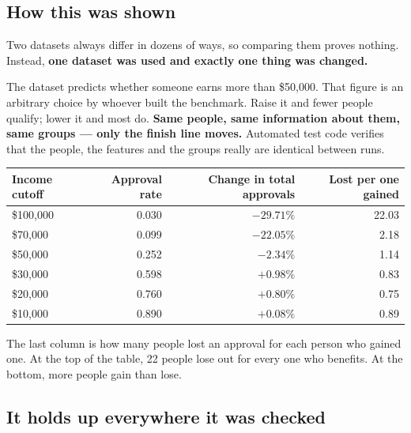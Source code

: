 \documentclass[11pt,a4paper]{article}
\begin{document}
\subsection{How this was shown}

Two datasets always differ in dozens of ways, so comparing them proves nothing. Instead,
\textbf{one dataset was used and exactly one thing was changed.}

The dataset predicts whether someone earns more than \$50{,}000. That figure is an arbitrary
choice by whoever built the benchmark. Raise it and fewer people qualify; lower it and most
do. \textbf{Same people, same information about them, same groups --- only the finish line
moves.} Automated test code verifies that the people, the features and the groups really are
identical between runs.

\begin{center}
\small
\begin{tabular}{lrrr}
\toprule
Income cutoff & Approval rate & Change in total approvals & Lost per one gained \\
\midrule
\$100{,}000 & 0.030 & $-29.71\%$ & 22.03 \\
\$70{,}000  & 0.099 & $-22.05\%$ & 2.18 \\
\$50{,}000  & 0.252 & $-2.34\%$  & 1.14 \\
\$30{,}000  & 0.598 & $+0.98\%$  & 0.83 \\
\$20{,}000  & 0.760 & $+0.80\%$  & 0.75 \\
\$10{,}000  & 0.890 & $+0.08\%$  & 0.89 \\
\bottomrule
\end{tabular}
\end{center}

The last column is how many people lost an approval for each person who gained one. At the
top of the table, 22 people lose out for every one who benefits. At the bottom, more people
gain than lose.

\subsection{It holds up everywhere it was checked}
\end{document}
